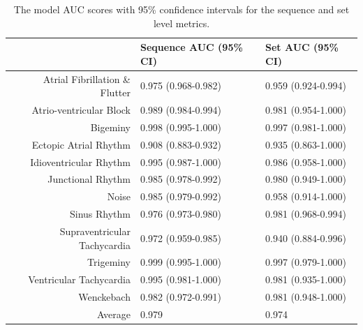 \begin{table}
\centering
\begin{tabular}{r l l}
\toprule
                               & Sequence AUC (95\% CI)   & Set AUC (95\% CI) \\
\midrule
Atrial Fibrillation \& Flutter & 0.975 (0.968-0.982) & 0.959 (0.924-0.994) \\
Atrio-ventricular Block        & 0.989 (0.984-0.994) & 0.981 (0.954-1.000) \\
Bigeminy                       & 0.998 (0.995-1.000) & 0.997 (0.981-1.000) \\
Ectopic Atrial Rhythm          & 0.908 (0.883-0.932) & 0.935 (0.863-1.000) \\
Idioventricular Rhythm         & 0.995 (0.987-1.000) & 0.986 (0.958-1.000) \\
Junctional Rhythm              & 0.985 (0.978-0.992) & 0.980 (0.949-1.000) \\
Noise                          & 0.985 (0.979-0.992) & 0.958 (0.914-1.000) \\
Sinus Rhythm                   & 0.976 (0.973-0.980) & 0.981 (0.968-0.994) \\
Supraventricular Tachycardia   & 0.972 (0.959-0.985) & 0.940 (0.884-0.996) \\
Trigeminy                      & 0.999 (0.995-1.000) & 0.997 (0.979-1.000) \\
Ventricular Tachycardia        & 0.995 (0.981-1.000) & 0.981 (0.935-1.000) \\
Wenckebach                     & 0.982 (0.972-0.991) & 0.981 (0.948-1.000) \\
\midrule
   Average                     & 0.979               & 0.974 \\
\bottomrule
\end{tabular}
\caption{The model AUC scores with 95\% confidence intervals for the sequence
         and set level metrics.}
\label{tab:arrhythmias:model_auc}
\end{table}

